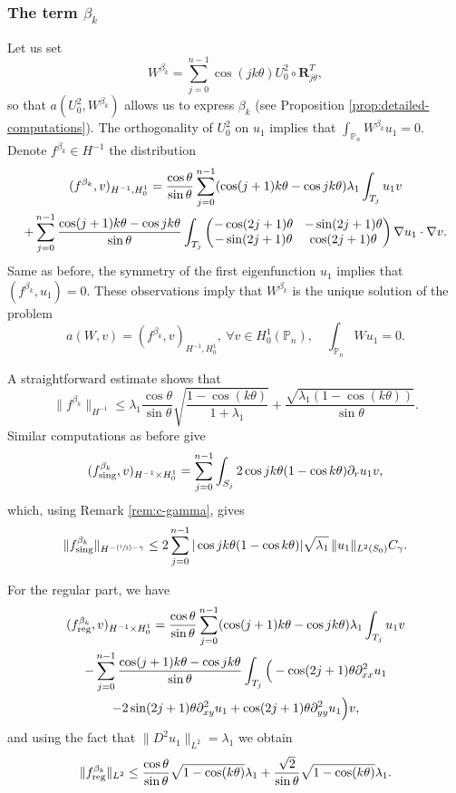\documentclass[JEP,XML,SOM,Unicode,ThmDefs,NoFloatCountersInSection,published]{cedram}
\newcommand{\Psfrac}[2]{(\sfrac{#1}{#2})}
\newcommand{\colsep}{\arraycolsep4.5pt}
\theoremstyle{plain}
\theoremstyle{definition}
\newcommand{\bo}[1]{{\boldsymbol#1}}
\newcommand{\reg}{\textup{reg}}
\newcommand{\sing}{\textup{sing}}
\def\Pp{{\mathbb{P}_n}}
\newcommand{\lb}{\lambda}
\begin{document}
\subsubsection*{The term $\beta_k$}
Let us set
\[
W^{\beta_k} = \sum_{j=0}^{n-1} \cos(jk\theta) U_0^2\circ \bo R_{j\theta}^T,
\]
so that $a(U_0^2,W^{\beta_k})$ allows us to express $\beta_k$ (see Proposition \ref{prop:detailed-computations}). The orthogonality of $U_0^2$ on $u_1$ implies that $\int_\Pp W^{\beta_k}u_1=0$. Denote $f^{\beta_k} \in H^{-1}$ the distribution
\vspace*{-5pt}
\begin{multline*}
(f^{\beta_k},v)_{H^{-1},H_0^1}
= \frac{\cos\theta}{\sin\theta}\sum_{j=0}^{n-1} (\cos(j+1)k\theta-\cos jk\theta) \lambda_1\int_{T_j} u_1 v\\\colsep
+ \sum_{j=0}^{n-1} \frac{\cos(j+1)k\theta-\cos jk\theta}{\sin \theta} \int_{T_j}\begin{pmatrix}
-\cos (2j+1)\theta & -\sin (2j+1) \theta \\
-\sin(2j+1)\theta & \cos (2j+1)\theta
\end{pmatrix}\nabla u_1 \cdot \nabla v.
\end{multline*}
Same as before, the symmetry of the first eigenfunction $u_1$ implies that $(f^{\beta_k},u_1) = 0$. These observations imply that $W^{\beta_k}$ is the unique solution of the problem
\[
a(W,v) = (f^{\beta_k},v)_{H^{-1},H_0^1},\ \forall v \in H_0^1(\Pp),\quad \int_\Pp Wu_1=0.
\]

A straightforward estimate shows that
\[
\|f^{\beta_k}\|_{H^{-1}} \leq \lambda_1\frac{\cos\theta}{\sin \theta} \sqrt{\frac{1-\cos(k\theta)}{1+\lambda_1}} +\frac{\sqrt{\lambda_1(1-\cos(k\theta))}}{\sin \theta}.
\]
Similar computations as before give
\[
(f_{\sing}^{\beta_k}, v)_{H^{-1}\times H^1_0} = \sum_{j=0}^{n-1}\int_{S_j} 2 \cos jk\theta(1-\cos k \theta) \partial_r u_1 v,
\]
which, using Remark \ref{rem:c-gamma}, gives
\[
\|f_{\sing}^{\beta_k}\|_{H^{-\Psfrac 12-\gamma}}\le 2\sum_{j=0}^{n-1} | \cos jk\theta(1-\cos k \theta)| \sqrt{\lb_1}\,\|u_1\|_{L^2(S_0)} C_\gamma.
\]

For the regular part, we have
\vspace*{-5pt}
\begin{multline*}(f_{\reg}^{\beta_k}, v)_{H^{-1}\times H^1_0}= \frac{\cos \theta}{\sin \theta}\sum_{j=0}^{n-1} (\cos (j+1)k\theta-\cos jk\theta) \lb_1 \int_{T_j} u_1v \\
- \sum_{j=0}^{n-1} \frac{\cos(j+1)k\theta-\cos jk\theta}{\sin \theta} \int_{T_j} \Big (-\cos (2j+1)\theta \partial^2_{xx}u_1 \\
-2 \sin (2j+1)\theta \partial^2_{xy} u_1+ \cos(2j+1)\theta \partial^2_{yy} u_1\Big)v,
\end{multline*}
and using the fact that $\|D^2 u_1\|_{L^2} = \lambda_1$ we obtain
\[
\|f_{\reg}^{\beta_k}\|_{L^2}\le \frac{\cos\theta}{\sin \theta}\sqrt{1-\cos (k \theta)} \lb_1 +\frac{\sqrt{2}}{\sin \theta} \sqrt{1- \cos (k \theta)}\lb_1 .
\]
\end{document}
